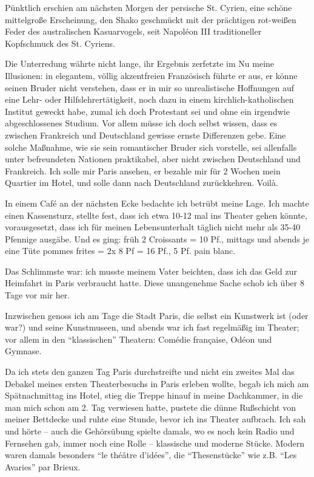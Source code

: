Pünktlich erschien am nächsten Morgen der persische St. Cyrien, eine schöne mittelgroße Erscheinung, den Shako geschmückt mit der prächtigen rot-weißen Feder des australischen Kasuarvogels, seit Napoléon III traditioneller Kopfschmuck des St. Cyriens.

Die Unterredung währte nicht lange, ihr Ergebnis zerfetzte im Nu meine Illusionen: in elegantem, völlig akzentfreien Französisch führte er aus, er könne seinen Bruder nicht verstehen, dass er in mir so unrealistische Hoffnungen auf eine Lehr- oder Hilfslehrertätigkeit, noch dazu in einem kirchlich-katholischen Institut geweckt habe, zumal ich doch Protestant sei und ohne ein irgendwie abgeschlossenes Studium. Vor allem müsse ich doch selbst wissen, dass es zwischen Frankreich und Deutschland gewisse ernste Differenzen gebe. Eine solche Maßnahme, wie sie sein romantischer Bruder sich vorstelle, sei allenfalls unter befreundeten Nationen praktikabel, aber nicht zwischen Deutschland und Frankreich. Ich solle mir Paris ansehen, er bezahle mir für 2 Wochen mein Quartier im Hotel, und solle dann nach Deutschland zurückkehren. Voilà.

In einem Café an der nächsten Ecke bedachte ich betrübt meine Lage. Ich machte einen Kassensturz, stellte fest, dass ich etwa 10-12 mal ins Theater gehen könnte, vorausgesetzt, dass ich für meinen Lebensunterhalt täglich nicht mehr als 35-40 Pfennige ausgäbe. Und es ging: früh 2 Croissants = 10 Pf., mittags und abends je eine Tüte pommes frites = 2x 8 Pf = 16 Pf., 5 Pf. pain blanc.

Das Schlimmste war: ich musste meinem Vater beichten, dass ich das Geld zur Heimfahrt in Paris verbraucht hatte. Diese unangenehme Sache schob ich über 8 Tage vor mir her.

Inzwischen genoss ich am Tage die Stadt Paris, die selbst ein Kunstwerk ist (oder war?) und seine Kunstmuseen, und abends war ich fast regelmäßig im Theater; vor allem in den \enquote{klassischen} Theatern: Comédie française, Odéon und Gymnase.

Da ich stets den ganzen Tag Paris durchstreifte und nicht ein zweites Mal das Debakel meines ersten Theaterbesuchs in Paris erleben wollte, begab ich mich am Spätnachmittag ins Hotel, stieg die Treppe hinauf in meine Dachkammer, in die man mich schon am 2. Tag verwiesen hatte, pustete die dünne Rußschicht von meiner Bettdecke und ruhte eine Stunde, bevor ich ins Theater aufbrach. Ich sah und hörte -- auch die Gehörsübung spielte damals, wo es noch kein Radio und Fernsehen gab, immer noch eine Rolle -- klassische und moderne Stücke. Modern waren damals besonders \enquote{le théâtre d'idées}, die \enquote{Thesenstücke} wie z.B. \enquote{Les Avaries} par Brieux.

